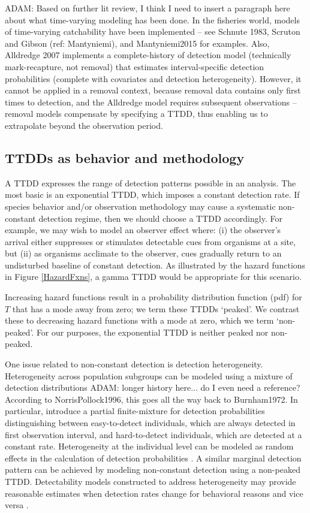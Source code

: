 \documentclass[useAMS,usenatbib,referee,12pt]{article}
\newcommand{\adam}[1]{{\color{blue} ADAM: #1}}
\begin{document}
\adam{Based on further lit review, I think I need to insert a paragraph here about what time-varying modeling has been done.  In the fisheries world, models of time-varying catchability have been implemented -- see Schnute 1983, Scruton and Gibson (ref: Mantyniemi), and Mantyniemi2015 for examples.  Also, Alldredge 2007 implements a complete-history of detection model (technically mark-recapture, not removal) that estimates interval-specific detection probabilities (complete with covariates and detection heterogeneity).  However, it cannot be applied in a removal context, because removal data contains only first times to detection, and the Alldredge model requires subsequent observations -- removal models compensate by specifying a TTDD, thus enabling us to extrapolate beyond the observation period.}  

\subsection{TTDDs as behavior and methodology}

A TTDD expresses the range of detection patterns possible in an analysis.  The most basic is an exponential TTDD, which imposes a constant detection rate.  If species behavior and/or observation methodology may cause a systematic non-constant detection regime, then we should choose a TTDD accordingly.  For example, we may wish to model an observer effect where: (i) the observer's arrival either suppresses or stimulates detectable cues from organisms at a site, but (ii) as organisms acclimate to the observer, cues gradually return to an undisturbed baseline of constant detection.  As illustrated by the hazard functions in Figure \ref{HazardFxns}, a gamma TTDD would be appropriate for this scenario.

Increasing hazard functions result in a probability distribution function (pdf) for $T$ that has a mode away from zero; we term these TTDDs `peaked'.  We contrast these to decreasing hazard functions with a mode at zero, which we term `non-peaked'.  For our purposes, the exponential TTDD is neither peaked nor non-peaked.

One issue related to non-constant detection is detection heterogeneity.  Heterogeneity across population subgroups can be modeled using a mixture of detection distributions \citep{Pledger2000}\adam{longer history here... do I even need a reference? According to NorrisPollock1996, this goes all the way back to Burnham1972}.  In particular, \citet{Farnsworth2002} introduce a partial finite-mixture for detection probabilities distinguishing between easy-to-detect individuals, which are always detected in first observation interval, and hard-to-detect individuals, which are detected at a constant rate.   Heterogeneity at the individual level can be modeled as random effects in the calculation of detection probabilities \citep{DorazioRoyle2003, Mantyniemi2005}.  A similar marginal detection pattern can be achieved by modeling non-constant detection using a non-peaked TTDD.  Detectability models constructed to address heterogeneity may provide reasonable estimates when detection rates change for behavioral reasons and vice versa \citep{Mantyniemi2005}.
\end{document}
